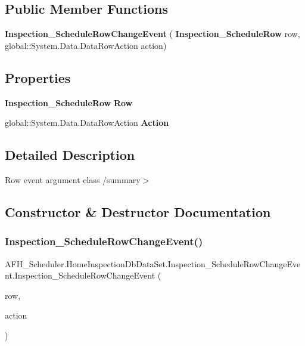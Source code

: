 \subsection*{Public Member Functions}
\begin{DoxyCompactItemize}
\item 
\textbf{ Inspection\+\_\+\+Schedule\+Row\+Change\+Event} (\textbf{ Inspection\+\_\+\+Schedule\+Row} row, global\+::\+System.\+Data.\+Data\+Row\+Action action)
\end{DoxyCompactItemize}
\subsection*{Properties}
\begin{DoxyCompactItemize}
\item 
\textbf{ Inspection\+\_\+\+Schedule\+Row} \textbf{ Row}\hspace{0.3cm}{\ttfamily  [get]}
\item 
global\+::\+System.\+Data.\+Data\+Row\+Action \textbf{ Action}\hspace{0.3cm}{\ttfamily  [get]}
\end{DoxyCompactItemize}


\subsection{Detailed Description}
Row event argument class /summary$>$ 

\subsection{Constructor \& Destructor Documentation}
\mbox{\label{class_a_f_h___scheduler_1_1_home_inspection_db_data_set_1_1_inspection___schedule_row_change_event_a4f9d8e6d86277d40480423be533959e5}} 
\subsubsection{Inspection\_ScheduleRowChangeEvent()}
{\footnotesize\ttfamily A\+F\+H\+\_\+\+Scheduler.\+Home\+Inspection\+Db\+Data\+Set.\+Inspection\+\_\+\+Schedule\+Row\+Change\+Event.\+Inspection\+\_\+\+Schedule\+Row\+Change\+Event (\begin{DoxyParamCaption}\item[{\textbf{ Inspection\+\_\+\+Schedule\+Row}}]{row,  }\item[{global\+::\+System.\+Data.\+Data\+Row\+Action}]{action }\end{DoxyParamCaption})}



